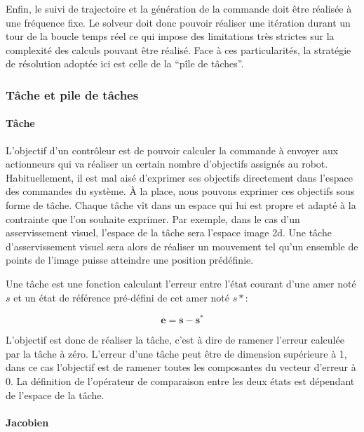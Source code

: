 Enfin, le suivi de trajectoire et la génération de la commande doit
être réalisée à une fréquence fixe. Le solveur doit donc pouvoir
réaliser une itération durant un tour de la boucle temps réel ce qui
impose des limitations très strictes sur la complexité des calculs
pouvant être réalisé. Face à ces particularités, la stratégie de
résolution adoptée ici est celle de la ``pîle de tâches''.


\subsubsection{Tâche et pile de tâches}

\paragraph{Tâche}

L'objectif d'un contrôleur est de pouvoir calculer la commande à
envoyer aux actionneurs qui va réaliser un certain nombre d'objectifs
assignés au robot. Habituellement, il est mal aisé d'exprimer ses
objectifs directement dans l'espace des commandes du système. À la
place, nous pouvons exprimer ces objectifs sous forme de tâche. Chaque
tâche vît dans un espace qui lui est propre et adapté à la contrainte
que l'on souhaite exprimer. Par exemple, dans le cas d'un
asservissement visuel, l'espace de la tâche sera l'espace image
2d. Une tâche d'asservissement visuel sera alors de réaliser un
mouvement tel qu'un ensemble de points de l'image puisse atteindre une
position prédéfinie.

\begin{mydef}
Une tâche est une fonction calculant l'erreur entre l'état courant
d'une amer noté $s$ et un état de référence pré-défini de cet amer
noté $s*$:

\begin{equation}
  \mathbf{e} = \mathbf{s} - \mathbf{s}^{*}
\end{equation}

L'objectif est donc de réaliser la tâche, c'est à dire de ramener
l'erreur calculée par la tâche à zéro. L'erreur d'une tâche peut être
de dimension supérieure à 1, dans ce cas l'objectif est de ramener
toutes les composantes du vecteur d'erreur à $0$. La définition de
l'opérateur de comparaison entre les deux états est dépendant de
l'espace de la tâche.
\end{mydef}

\paragraph{Jacobien}


